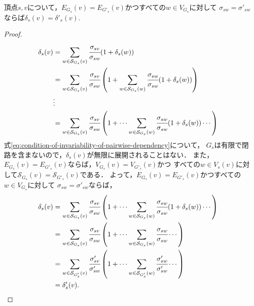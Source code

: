 \begin{lemma}
  \label{lemma:condition-of-invariability-of-pairwise-dependency}
  頂点$s,v$について，$E_{G_s}(v)=E_{G'_s}(v)$かつすべての$w\in V_{G_s}$に対して
  $\sigma_{sw}=\sigma'_{sw}$ならば$\delta_s(v)=\delta'_s(v)$.
\end{lemma}
\begin{proof}
  \begin{equation*}
    \begin{aligned}
      \delta_s(v)
      &=\sum_{w\in\mathcal{S}_{G_s}(v)}\cfrac{\sigma_{sv}}{\sigma_{sw}}(1+\delta_s(w)) \\
      &=\sum_{w\in\mathcal{S}_{G_s}(v)}\cfrac{\sigma_{sv}}{\sigma_{sw}}\left(1+
      \sum_{w\in\mathcal{S}_{G_s}(w)}\cfrac{\sigma_{sw}}{\sigma_{sw}}(1+\delta_s(w))
      \right) \\
      &\vdots \\
      &=\sum_{w\in\mathcal{S}_{G_s}(v)}\cfrac{\sigma_{sv}}{\sigma_{sw}}\left(1+\cdots
      \sum_{w\in\mathcal{S}_{G_s}(w)}\cfrac{\sigma_{sw}}{\sigma_{sw}}(1+\delta_s(w))
      \cdots\right)
      \label{eq:condition-of-invariability-of-pairwise-dependency}
    \end{aligned}
  \end{equation*}
  式\eqref{eq:condition-of-invariability-of-pairwise-dependency}について，
  $G_s$は有限で閉路を含まないので，$\delta_s(v)$が無限に展開されることはない．
  また，$E_{G_s}(v)=E_{G'_s}(v)$ならば，$V_{G_s}(v)=V_{G'_s}(v)$かつ
  すべての$w\in V_s(v)$に対して$\mathcal{S}_{G_s}(v)=\mathcal{S}_{G'_s}(v)$である．
  よって，$E_{G_s}(v)=E_{G'_s}(v)$かつすべての$w\in V_{G_s}$に対して
  $\sigma_{sw}=\sigma'_{sw}$ならば，
  \begin{equation*}
    \begin{aligned}
      \delta_s(v)
      &=\sum_{w\in\mathcal{S}_{G_s}(v)}\cfrac{\sigma_{sv}}{\sigma_{sw}}\left(1+\cdots
      \sum_{w\in\mathcal{S}_{G_s}(w)}\cfrac{\sigma_{sw}}{\sigma_{sw}}(1+\delta_s(w))
      \cdots\right) \\
      &=\sum_{w\in\mathcal{S}_{G_s}(v)}\cfrac{\sigma_{sv}}{\sigma_{sw}}\left(1+\cdots
      \sum_{w\in\mathcal{S}_{G_s}(w)}\cfrac{\sigma_{sw}}{\sigma_{sw}}
      \cdots\right) \\
      &=\sum_{w\in\mathcal{S}_{G'_s}(v)}\cfrac{\sigma'_{sv}}{\sigma'_{sw}}\left(1+\cdots
      \sum_{w\in\mathcal{S}_{G'_s}(w)}\cfrac{\sigma'_{sw}}{\sigma'_{sw}}
      \cdots\right) \\
      &=\delta'_s(v).
    \end{aligned}
  \end{equation*}
\end{proof}

